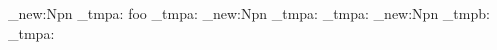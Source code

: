 \ExplSyntaxOn
\cs_new:Npn \zutil_tmpa: { foo }
\zutil_tmpa:
\cs_new:Npn \any_tmpa: { }
\zutil_tmpa:
\cs_new:Npn \any_tmpb: { \any_tmpa: }
\ExplSyntaxOff
